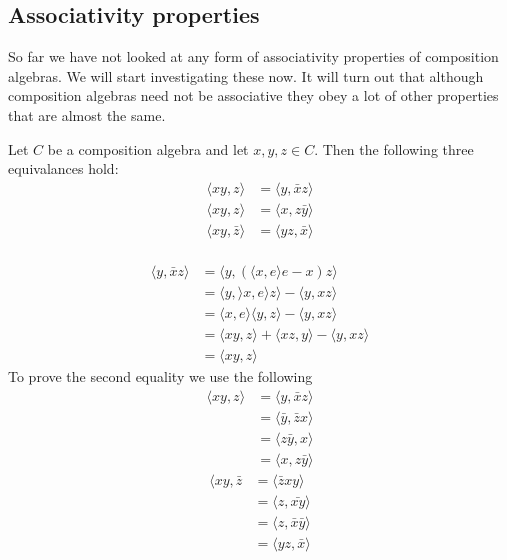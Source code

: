 \documentclass[../Thesis.tex]{subfiles}
\begin{document}
\subsection{Associativity properties}
So far we have not looked at any form of associativity properties of composition algebras. We will start investigating these now. It will turn out that although composition algebras need not be associative they obey a lot of other properties that are almost the same.
\begin{prop}
Let $C$ be a composition algebra and let $x,y, z \in C$. Then the following three equivalances hold:
\begin{align}
\langle xy, z \rangle &= \langle y, \bar{x}z \rangle\\
\langle xy, z \rangle &= \langle x, z\bar{y} \rangle \\
\langle xy, \bar{z} \rangle &= \langle yz, \bar{x} \rangle \\
\end{align}
\end{prop}
\begin{myproof}
\begin{align*}
\langle y, \bar{x}z \rangle &= \langle y, (\langle x, e \rangle e - x ) z \rangle \\
&= \langle y, \rangle x, e \rangle z \rangle - \langle y, xz \rangle \\
&= \langle x, e\rangle \langle y, z \rangle - \langle y, xz \rangle\\
&= \langle xy, z \rangle + \langle xz, y \rangle - \langle y, xz \rangle\\
&= \langle xy, z \rangle
\end{align*}
To prove the second equality we use the following
\begin{align*}
\langle xy, z \rangle &= \langle y , \bar{x}z \rangle\\
&= \langle \bar{y}, \bar{z}x \rangle\\
&= \langle z \bar{y}, x \rangle\\
&= \langle x, z \bar{y} \rangle
\end{align*}
\begin{align*}
\langle xy, \bar{z} &= \langle \bar{z} xy \rangle\\
&= \langle z, \bar{xy} \rangle \\
&= \langle z, \bar{x} \bar{y} \rangle \\
&= \langle yz , \bar{x} \rangle
\end{align*}
\end{myproof}
\end{document}
